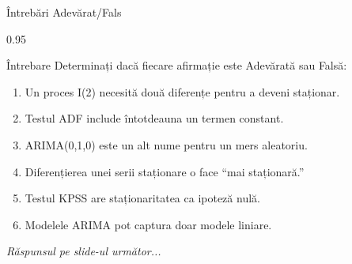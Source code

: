 \documentclass[9pt, aspectratio=169, t]{beamer}
\begin{document}
\begin{frame}{Întrebări Adevărat/Fals}
    \begin{cminipage}{0.95\textwidth}
    \begin{alertblock}{Întrebare}
        Determinați dacă fiecare afirmație este Adevărată sau Falsă:
    \end{alertblock}

    \vspace{0.3cm}
    \begin{enumerate}\setlength{\itemsep}{0pt}
        \item Un proces I(2) necesită două diferențe pentru a deveni staționar.
        \item Testul ADF include întotdeauna un termen constant.
        \item ARIMA(0,1,0) este un alt nume pentru un mers aleatoriu.
        \item Diferențierea unei serii staționare o face ``mai staționară.''
        \item Testul KPSS are staționaritatea ca ipoteză nulă.
        \item Modelele ARIMA pot captura doar modele liniare.
    \end{enumerate}

    \vspace{0.3cm}
    \begin{center}
        \textit{Răspunsul pe slide-ul următor...}
    \end{center}
    \end{cminipage}
\end{frame}
\end{document}

